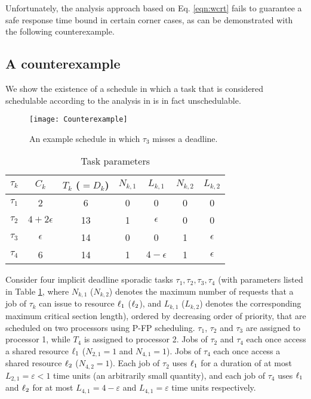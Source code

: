 Unfortunately, the analysis approach based on Eq. \ref{eqn:wcrt} fails to guarantee a safe response time bound in certain corner cases, as can be demonstrated with the following counterexample.

\subsection{A counterexample}
\label{sec:counterexample}

We show the existence of a schedule in which a task that is considered schedulable according to the analysis in \cite{lakshmanan-2009} is in fact unschedulable.

\begin{figure}[!ht]
\captionsetup{belowskip=-1pt}
\begin{center}
\texttt{[image: Counterexample]}
\caption{An example schedule in which $\tau_3$ misses a deadline. 
}
\label{fig:counterexample}
\end{center}
\end{figure}

\begin{table}
\centering
    \begin{tabular}{|c|c|c|c|c|c|c|} 
 \hline
        $\tau_k$ & $C_k$ & $T_k$ ($= D_k$) & $N_{k,1}$ & $L_{k,1}$ & $N_{k,2}$ & $L_{k,2}$\\
        \hline
        $\tau_1$ & 2             & 6  & 0 & 0 & 0 & 0\\ 
        $\tau_2$ & $4+2\epsilon$ & 13 & 1 & $\epsilon$ & 0 & 0\\
        $\tau_3$ & $\epsilon$    & 14 & 0 & 0 & 1 & $\epsilon$\\
        $\tau_4$ & 6             & 14 & 1 & $4-\epsilon$ & 1 & $\epsilon$ \\ 
        \hline
    \end{tabular}
    \caption{Task parameters}
    \label{table:parameters}
\end{table}

Consider four implicit deadline sporadic tasks ${\tau_1, \tau_2, \tau_3, \tau_4}$ (with parameters listed in Table \ref{table:parameters}, where $N_{k,1}$ ($N_{k,2}$) denotes the maximum number of requests that a job of $\tau_k$ can issue to resource $\ell_1$ ($\ell_2$), and $L_{k,1}$ ($L_{k,2}$) denotes the corresponding maximum critical section length), ordered by decreasing order of priority, that are scheduled on two processors using P-FP scheduling. $\tau_1$, $\tau_2$ and $\tau_3$ are assigned to processor 1, while $T_4$ is assigned to processor 2. Jobs of $\tau_2$ and $\tau_4$   each once access a shared resource $\ell_1$  ($N_{2,1} = 1$ and $N_{4,1} = 1$). Jobs of $\tau_4$ each once access a shared resource $\ell_2$ ($N_{4,2} = 1$). Each job of $\tau_2$ uses $\ell_1$ for a duration of at most $L_{2,1} = \varepsilon < 1$ time units (an arbitrarily small quantity), and each job of $\tau_4$ uses $\ell_1$ and $\ell_2$ for at most $L_{4,1} = 4-\varepsilon$ and $L_{4,1} = \varepsilon$ time units respectively. 

